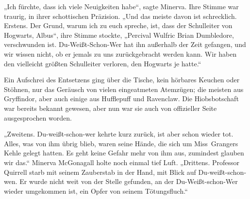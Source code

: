 „Ich fürchte, dass ich viele Neuigkeiten habe“, sagte Minerva.
Ihre Stimme war traurig, in ihrer schottischen Präzision.
„Und das meiste davon ist schrecklich. Erstens. Der Grund, warum ich zu euch spreche, ist, dass der Schulleiter von Hogwarts, Albus“, ihre Stimme stockte,
„Percival Wulfric Brian Dumbledore, verschwunden ist. Du-Weißt-Schon-Wer hat ihn außerhalb der Zeit gefangen, und wir wissen nicht, ob er jemals zu uns zurückgebracht werden kann. Wir haben den vielleicht größten Schulleiter verloren, den Hogwarts je hatte.“

Ein Aufschrei des Entsetzens ging über die Tische, kein hörbares Keuchen oder Stöhnen, nur das Geräusch von vielen eingeatmeten Atemzügen; die meisten aus Gryffindor, aber auch einige aus Hufflepuff und Ravenclaw. Die Hiobsbotschaft war bereits bekannt gewesen, aber nun war sie auch von offizieller Seite ausgesprochen worden.

„Zweitens. Du-weißt-schon-wer kehrte kurz zurück, ist aber schon wieder tot. Alles, was von ihm übrig blieb, waren seine Hände, die sich um Miss~Grangers Kehle gelegt hatten. Es geht keine Gefahr mehr von ihm aus, zumindest glauben wir das.“
Minerva McGonagall holte noch einmal tief Luft.
„Drittens. Professor Quirrell starb mit seinem Zauberstab in der Hand, mit Blick auf Du-weißt-schon-wen. Er wurde nicht weit von der Stelle gefunden, an der Du-Weißt-schon-Wer wieder umgekommen ist, ein Opfer von seinem Tötungsfluch.“

